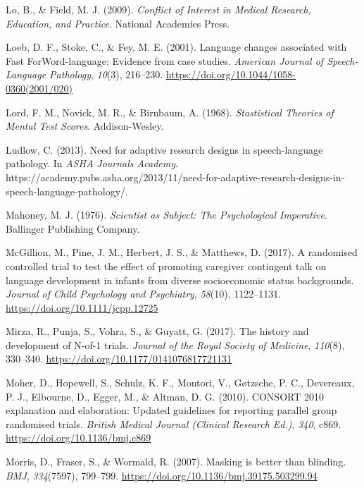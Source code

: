 \documentclass{krantz}
\newlength{\cslhangindent}
\newlength{\cslentryspacingunit} %
\newenvironment{CSLReferences}[2] %
{%
\setlength{\parindent}{0pt}
\ifodd #1
\let\oldpar\par
\def\par{\hangindent=\cslhangindent\oldpar}
\fi
\setlength{\parskip}{#2\cslentryspacingunit}
}%
{}
\begin{document}
\begin{CSLReferences}{1}{0}
\leavevmode{}%
Lo, B., \& Field, M. J. (2009). \emph{Conflict of {Interest} in {Medical Research}, {Education}, and {Practice}}. {National Academies Press}.

\leavevmode{}%
Loeb, D. F., Stoke, C., \& Fey, M. E. (2001). Language changes associated with {Fast ForWord-language}: {Evidence} from case studies. \emph{American Journal of Speech-Language Pathology}, \emph{10}(3), 216--230. \url{https://doi.org/10.1044/1058-0360(2001/020)}

\leavevmode{}%
Lord, F. M., Novick, M. R., \& Birnbaum, A. (1968). \emph{Stastistical {Theories} of {Mental Test Scores}}. {Addison-Wesley}.

\leavevmode{}%
Ludlow, C. (2013). Need for adaptive research designs in speech-language pathology. In \emph{ASHA Journals Academy}. https://academy.pubs.asha.org/2013/11/need-for-adaptive-research-designs-in-speech-language-pathology/.

\leavevmode{}%
Mahoney, M. J. (1976). \emph{Scientist as {Subject}: {The Psychological Imperative}}. {Ballinger Publishing Company}.

\leavevmode{}%
McGillion, M., Pine, J. M., Herbert, J. S., \& Matthews, D. (2017). A randomised controlled trial to test the effect of promoting caregiver contingent talk on language development in infants from diverse socioeconomic status backgrounds. \emph{Journal of Child Psychology and Psychiatry}, \emph{58}(10), 1122--1131. \url{https://doi.org/10.1111/jcpp.12725}

\leavevmode{}%
Mirza, R., Punja, S., Vohra, S., \& Guyatt, G. (2017). The history and development of {N-of-1} trials. \emph{Journal of the Royal Society of Medicine}, \emph{110}(8), 330--340. \url{https://doi.org/10.1177/0141076817721131}

\leavevmode{}%
Moher, D., Hopewell, S., Schulz, K. F., Montori, V., Gøtzsche, P. C., Devereaux, P. J., Elbourne, D., Egger, M., \& Altman, D. G. (2010). {CONSORT} 2010 explanation and elaboration: Updated guidelines for reporting parallel group randomised trials. \emph{British Medical Journal (Clinical Research Ed.)}, \emph{340}, c869. \url{https://doi.org/10.1136/bmj.c869}

\leavevmode{}%
Morris, D., Fraser, S., \& Wormald, R. (2007). Masking is better than blinding. \emph{BMJ}, \emph{334}(7597), 799--799. \url{https://doi.org/10.1136/bmj.39175.503299.94}


\end{CSLReferences}
\end{document}
